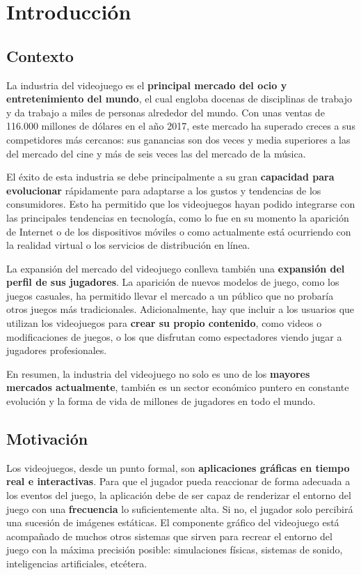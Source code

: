 \chapter{Introducción}
\label{chap:introducción}
\section{Contexto}
La industria del videojuego es el \textbf{principal mercado del ocio y entretenimiento del mundo}, el cual engloba docenas de disciplinas de trabajo y da trabajo a miles de personas alrededor del mundo. Con unas ventas de 116.000 millones de dólares\cite{libro_blanco} en el año 2017, este mercado ha superado creces a sus competidores más cercanos: sus ganancias son dos veces y media superiores a las del mercado del cine y más de seis veces las del mercado de la música.

El éxito de esta industria se debe principalmente a su gran \textbf{capacidad para evolucionar} rápidamente para adaptarse a los gustos y tendencias de los consumidores. Esto ha permitido que los videojuegos hayan podido integrarse con las principales tendencias en tecnología, como lo fue en su momento la aparición de Internet o de los dispositivos móviles o como actualmente está ocurriendo con la realidad virtual o los servicios de distribución en línea.  

La expansión del mercado del videojuego conlleva también una \textbf{expansión del perfil de sus jugadores}. La aparición de nuevos modelos de juego, como los juegos casuales, ha permitido llevar el mercado a un público que no probaría otros juegos más tradicionales. Adicionalmente, hay que incluir a los usuarios que utilizan los videojuegos para \textbf{crear su propio contenido}, como videos o modificaciones de juegos, o los que disfrutan como espectadores viendo jugar a jugadores profesionales.  

En resumen, la industria del videojuego no solo es uno de los \textbf{mayores mercados actualmente}, también es un sector económico puntero en constante evolución y la forma de vida de millones de jugadores en todo el mundo. 

\section{Motivación}
Los videojuegos, desde un punto formal, son \textbf{aplicaciones gráficas en tiempo real e interactivas}\cite{libro_esi}. Para que el jugador pueda reaccionar de forma adecuada a los eventos del juego, la aplicación debe de ser capaz de renderizar el entorno del juego con una \textbf{frecuencia} lo suficientemente alta. Si no, el jugador solo percibirá una sucesión de imágenes estáticas. El componente gráfico del videojuego está acompañado de muchos otros sistemas que sirven para recrear el entorno del juego con la máxima precisión posible: simulaciones físicas, sistemas de sonido, inteligencias artificiales, etcétera.

